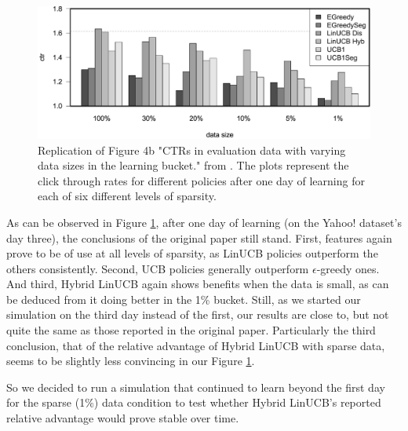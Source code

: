 \documentclass{jss}
\begin{document}
\begin{figure}[H]
  \centering
    \includegraphics[width=.99\textwidth]{fig/section_8_bar}
      \caption{Replication of Figure 4b "CTRs in evaluation data with varying data sizes in the learning bucket." from \cite{Li2010}. The plots represent the click through rates for different policies after one day of learning for each of six different levels of sparsity.}
      \label{fig:section_8_bar}
\end{figure}

As can be observed in Figure \ref{fig:section_8_bar}, after one day of learning (on the Yahoo! dataset's day three), the conclusions of the original paper still stand. First, features again prove to be of use at all levels of sparsity, as LinUCB policies outperform the others consistently. Second, UCB policies generally outperform $\epsilon$-greedy ones. And third, Hybrid LinUCB again shows benefits when the data is small, as can be deduced from it doing better in the 1\% bucket. Still, as we started our simulation on the third day instead of the first, our results are close to, but not quite the same as those reported in the original paper. Particularly the third conclusion, that of the relative advantage of Hybrid LinUCB with sparse data, seems to be slightly less convincing in our Figure \ref{fig:section_8_bar}.

So we decided to run a simulation that continued to learn beyond the first day for the sparse (1\%) data condition to test whether Hybrid LinUCB's reported relative advantage would prove stable over time.
\end{document}
